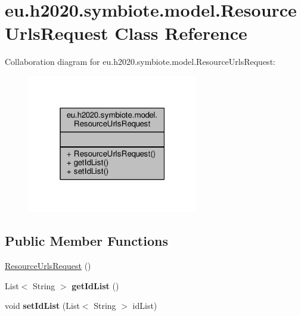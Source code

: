 \hypertarget{classeu_1_1h2020_1_1symbiote_1_1model_1_1ResourceUrlsRequest}{}\section{eu.\+h2020.\+symbiote.\+model.\+Resource\+Urls\+Request Class Reference}
\label{classeu_1_1h2020_1_1symbiote_1_1model_1_1ResourceUrlsRequest}


Collaboration diagram for eu.\+h2020.\+symbiote.\+model.\+Resource\+Urls\+Request\+:
\nopagebreak
\begin{figure}[H]
\begin{center}
\leavevmode
\includegraphics[width=211pt]{classeu_1_1h2020_1_1symbiote_1_1model_1_1ResourceUrlsRequest__coll__graph}
\end{center}
\end{figure}
\subsection*{Public Member Functions}
\begin{DoxyCompactItemize}
\item 
\hyperlink{classeu_1_1h2020_1_1symbiote_1_1model_1_1ResourceUrlsRequest_a0b29b4c31ccedbcd6d3bfd47981e9b2b}{Resource\+Urls\+Request} ()
\item 
List$<$ String $>$ {\bfseries get\+Id\+List} ()\hypertarget{classeu_1_1h2020_1_1symbiote_1_1model_1_1ResourceUrlsRequest_a57d4bee1002538edb73ffe609287f60b}{}\label{classeu_1_1h2020_1_1symbiote_1_1model_1_1ResourceUrlsRequest_a57d4bee1002538edb73ffe609287f60b}

\item 
void {\bfseries set\+Id\+List} (List$<$ String $>$ id\+List)\hypertarget{classeu_1_1h2020_1_1symbiote_1_1model_1_1ResourceUrlsRequest_a642f4d0955c1313abd49fc23b2bdeabb}{}\label{classeu_1_1h2020_1_1symbiote_1_1model_1_1ResourceUrlsRequest_a642f4d0955c1313abd49fc23b2bdeabb}

\end{DoxyCompactItemize}


